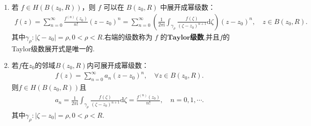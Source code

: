 \documentclass[../../main.tex]{subfiles}%
\begin{document}
\begin{theorem}[全纯函数的Taylor展开]\label{theorem:定理4.3.1}
\begin{enumerate}[(1)]
\item 若 \( f \in H(B(z_0,R)) \)，则 \( f \) 可以在 \( B(z_0,R) \) 中展开成幂级数：
\begin{align}
f(z)=\sum_{n=0}^{\infty}{\frac{f^{(n)}(z_0)}{n!}\left( z-z_0 \right) ^n}=\sum_{n=0}^{\infty}{\left( \frac{1}{2\pi \mathrm{i}}\int_{\gamma _{\rho}}{\frac{f\left( \zeta \right)}{\left( \zeta -z_0 \right) ^{n+1}}\mathrm{d}\zeta} \right) \left( z-z_0 \right) ^n},\quad z\in B(z_0,R).\label{eq:taylor312412342}
\end{align}
其中$\gamma _{\rho}:\left| \zeta -z_0 \right|=\rho ,0<\rho <R.$右端的级数称为 \( f \) 的$\mathbf{Taylor}$\textbf{级数},并且$f$的Taylor级数展开式是唯一的.

\item 若\( f \)在\( z_0 \)的邻域$B(z_0, R)$内可展开成幂级数：
\begin{align*}
f(z) = \sum_{n=0}^{\infty} a_n (z - z_0)^n, \quad \forall z \in B(z_0, R).
\end{align*}
则\( f \in H(B(z_0, R))\)且
\begin{align*}
a_n=\frac{1}{2\pi \mathrm{i}}\int_{\gamma _{\rho}}{\frac{f\left( \zeta \right)}{\left( \zeta -z_0 \right) ^{n+1}}\mathrm{d}\zeta}=\frac{f^{(n)}(z_0)}{n!},\quad n=0,1,\cdots .
\end{align*}
其中$\gamma _{\rho}:\left| \zeta -z_0 \right|=\rho ,0<\rho <R.$
\end{enumerate}
\end{theorem}
\end{document}
